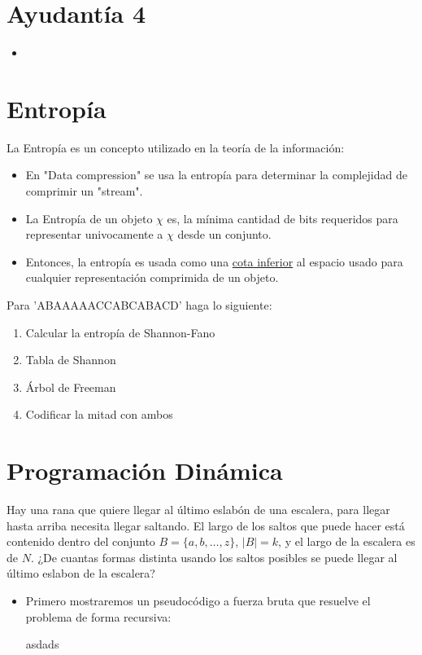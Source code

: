 \documentclass[12pt]{article}
\begin{document}
\section{Ayudantía 4}

\begin{itemize}
  \item 
\end{itemize}

\section{Entropía}

La Entropía es un concepto utilizado en la teoría de la información:

\begin{itemize}
  \item En "Data compression" se usa la entropía para determinar la complejidad de comprimir un "stream".
  \item La Entropía de un objeto $\chi $ es, la mínima cantidad de bits requeridos para representar univocamente a $\chi $ desde un conjunto.
  \item Entonces, la entropía es usada como una \underline{cota inferior} al espacio usado para cualquier representación comprimida de un objeto.
\end{itemize}

\begin{ejercicio}
  Para 'ABAAAAACCABCABACD' haga lo siguiente:

  \begin{enumerate}
    \item Calcular la entropía de Shannon-Fano
    \item Tabla de Shannon
    \item Árbol de Freeman
    \item Codificar la mitad con ambos
  \end{enumerate}
\end{ejercicio}

\newpage

\section{Programación Dinámica}

\begin{ejercicio}
  Hay una rana que quiere llegar al último eslabón de una escalera, para llegar hasta arriba necesita llegar saltando. El largo de los saltos que puede hacer está contenido dentro del conjunto $B = \{a, b, \dots, z\}$, $\left\lvert B \right\rvert = k$, y el largo de la escalera es de $N$. ¿De cuantas formas distinta usando los saltos posibles se puede llegar al último eslabon de la escalera?
\end{ejercicio}

\begin{itemize}
  \item Primero mostraremos un pseudocódigo a fuerza bruta que resuelve el problema de forma recursiva:
  
  \begin{codeblock}
    asdads
    
  \end{codeblock}

\end{itemize}
\end{document}
